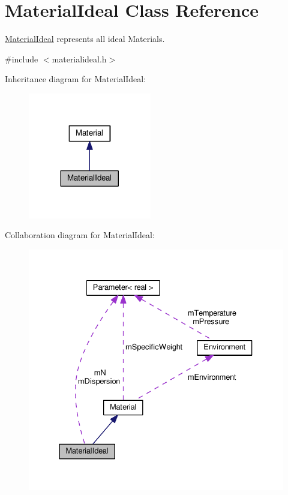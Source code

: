 \hypertarget{classMaterialIdeal}{}\section{Material\+Ideal Class Reference}
\label{classMaterialIdeal}


\hyperlink{classMaterialIdeal}{Material\+Ideal} represents all ideal Materials.  




{\ttfamily \#include $<$materialideal.\+h$>$}



Inheritance diagram for Material\+Ideal\+:
\nopagebreak
\begin{figure}[H]
\begin{center}
\leavevmode
\includegraphics[width=152pt]{classMaterialIdeal__inherit__graph}
\end{center}
\end{figure}


Collaboration diagram for Material\+Ideal\+:
\nopagebreak
\begin{figure}[H]
\begin{center}
\leavevmode
\includegraphics[width=331pt]{classMaterialIdeal__coll__graph}
\end{center}
\end{figure}

